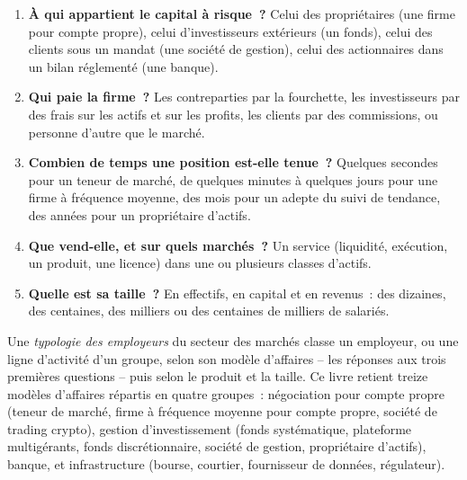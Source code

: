 \begin{enumerate}
\item \textbf{À qui appartient le capital à risque~?} Celui des propriétaires (une firme pour compte propre), celui d'investisseurs extérieurs (un fonds), celui des clients sous
un mandat (une société de gestion), celui des actionnaires dans un bilan réglementé (une banque).
\item \textbf{Qui paie la firme~?} Les contreparties par la fourchette, les investisseurs par des frais sur les actifs et sur les profits,
les clients par des commissions, ou personne d'autre que le marché.
\item \textbf{Combien de temps une position est-elle tenue~?} Quelques secondes pour un teneur de marché, de quelques minutes à quelques jours pour une firme à fréquence moyenne,
des mois pour un adepte du suivi de tendance, des années pour un propriétaire d'actifs.
\item \textbf{Que vend-elle, et sur quels marchés~?} Un service (liquidité, exécution, un produit, une licence) dans une ou
plusieurs classes d'actifs.
\item \textbf{Quelle est sa taille~?} En effectifs, en capital et en revenus~: des dizaines, des centaines, des milliers ou des centaines de milliers
de salariés.
\end{enumerate}

\begin{definition}\label{def:in:a-map-of-the-industry:taxonomy}
Une \emph{typologie des employeurs} du secteur des marchés classe un employeur, ou une ligne d'activité d'un groupe,
selon son modèle d'affaires -- les réponses aux trois premières questions -- puis selon le produit et la taille. Ce livre
retient treize modèles d'affaires répartis en quatre groupes~: négociation pour compte propre (teneur de marché, firme à fréquence moyenne pour compte propre, société de
trading crypto), gestion d'investissement (fonds systématique, plateforme multigérants, fonds discrétionnaire, société de gestion, propriétaire
d'actifs), banque, et infrastructure (bourse, courtier, fournisseur de données, régulateur).
\end{definition}

